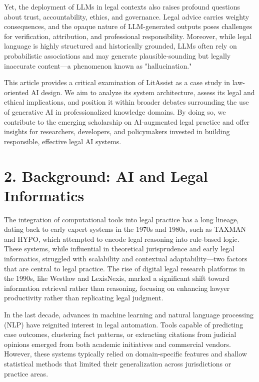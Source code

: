 \documentclass[12pt,a4paper]{article}
\begin{document}
Yet, the deployment of LLMs in legal contexts also raises profound questions about trust, accountability, ethics, and governance. Legal advice carries weighty consequences, and the opaque nature of LLM-generated outputs poses challenges for verification, attribution, and professional responsibility. Moreover, while legal language is highly structured and historically grounded, LLMs often rely on probabilistic associations and may generate plausible-sounding but legally inaccurate content—a phenomenon known as "hallucination."

This article provides a critical examination of LitAssist as a case study in law-oriented AI design. We aim to analyze its system architecture, assess its legal and ethical implications, and position it within broader debates surrounding the use of generative AI in professionalized knowledge domains. By doing so, we contribute to the emerging scholarship on AI-augmented legal practice and offer insights for researchers, developers, and policymakers invested in building responsible, effective legal AI systems.

\section*{2. Background: AI and Legal Informatics}

The integration of computational tools into legal practice has a long lineage, dating back to early expert systems in the 1970s and 1980s, such as TAXMAN and HYPO, which attempted to encode legal reasoning into rule-based logic. These systems, while influential in theoretical jurisprudence and early legal informatics, struggled with scalability and contextual adaptability—two factors that are central to legal practice. The rise of digital legal research platforms in the 1990s, like Westlaw and LexisNexis, marked a significant shift toward information retrieval rather than reasoning, focusing on enhancing lawyer productivity rather than replicating legal judgment.

In the last decade, advances in machine learning and natural language processing (NLP) have reignited interest in legal automation. Tools capable of predicting case outcomes, clustering fact patterns, or extracting citations from judicial opinions emerged from both academic initiatives and commercial vendors. However, these systems typically relied on domain-specific features and shallow statistical methods that limited their generalization across jurisdictions or practice areas.
\end{document}
